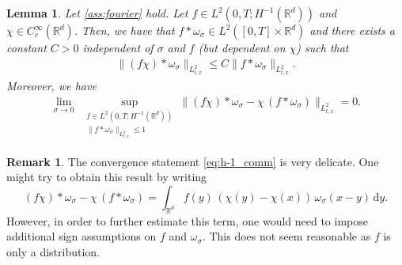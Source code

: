 \documentclass[reqno, 11pt]{amsart}
\numberwithin{equation}{section}
\newtheorem{lem}[thm]{Lemma}
\theoremstyle{definition}
\newtheorem{rem}[thm]{Remark}
\begin{document}
\begin{lem}
    \label{lem:h-1_mod_bound}
    Let \eqref{ass:fourier} hold. Let $f\in L^2(0,T; H^{-1}(\mathbb{R}^{d}))$ and $\chi\in C_c^\infty(\mathbb{R}^{d})$. Then, we have that $f\ast\omega_\sigma \in L^2([0,T]\times \mathbb{R}^{d})$ and there exists a constant $C>0$ independent of $\sigma$ and $f$ (but dependent on $\chi$) such that
    \begin{align}
        \label{eq:pert_map_is_bnd}
        \|(f\chi)\ast\omega_\sigma\|_{L_{t,x}^2}\leq C \|f\ast\omega_\sigma\|_{L_{t,x}^2}.
    \end{align}
    Moreover, we have
    \begin{align}
        \label{eq:h-1_comm}
        \lim_{\sigma\to 0}\;\sup_{\substack{f\in L^2(0,T;H^{-1}(\mathbb{R}^{d})) \\ \|f\ast\omega_\sigma\|_{L_{t,x}^2}\leq 1}} \|(f\chi)\ast\omega_\sigma-\chi\,(f\ast\omega_\sigma)\|_{L_{t,x}^2}=0.
    \end{align}
\end{lem}
\begin{rem}The convergence statement \eqref{eq:h-1_comm} is very delicate. One might try to obtain this result by writing
    $$
    (f\chi)\ast\omega_\sigma-\chi\,(f\ast\omega_\sigma) = \int_{\mathbb{R}^{d}} f(y)\,(\chi(y) - \chi(x))\, \omega_{\sigma}(x-y) \,\mathrm{d} y.
    $$
    However, in order to further estimate this term, one would need to impose additional sign assumptions on $f$ and $\omega_{\sigma}$. This does not seem reasonable as $f$ is only a distribution.
\end{rem}
\end{document}
